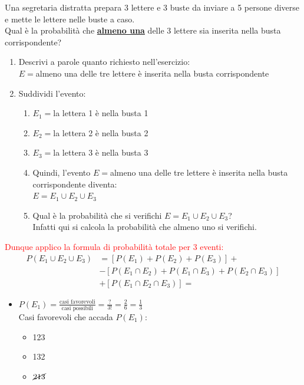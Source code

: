\documentclass{article}  %
\theoremstyle{definition}
\begin{document}
\begin{esercizio}[Esercizio]
	Una segretaria distratta prepara 3 lettere e 3 buste da inviare a 5 persone diverse e mette le lettere nelle buste a caso. \\
	Qual è la probabilità che \underline{\textbf{almeno una}} delle 3 lettere sia inserita nella busta corrispondente?
	\begin{enumerate}
		\item Descrivi a parole quanto richiesto nell'esercizio: \\
		      $E=$almeno una delle tre lettere è inserita nella busta corrispondente
		\item Suddividi l'evento:
		      \begin{enumerate}
			      \item $E_1=$la lettera 1 è nella busta 1
			      \item $E_2=$la lettera 2 è nella busta 2
			      \item $E_3=$la lettera 3 è nella busta 3
			      \item Quindi, l'evento $E=$almeno una delle tre lettere è inserita nella busta corrispondente diventa: \\ $E=E_1 \cup E_2 \cup E_3$
			      \item Qual è la probabilità che si verifichi $E=E_1 \cup E_2 \cup E_3$? \\ Infatti qui si calcola la probabilità che almeno uno si verifichi.
		      \end{enumerate}
	\end{enumerate}
	\textcolor{red}{Dunque applico la formula di probabilità totale per $3$ eventi:}
	\begin{align*}
		P(E_1 \cup E_2 \cup E_3)
		 & = [P(E_1)+P(E_2)+P(E_3)] +                          \\
		 & - [P(E_1 \cap E_2)+P(E_1 \cap E_3)+P(E_2 \cap E_3)] \\
		 & + [P(E_1 \cap E_2 \cap E_3)] =
	\end{align*}
	\begin{itemize}
		\item $P(E_1)=\frac{\text{casi favorevoli}}{\text{casi possibili}}=\frac{?}{3!}=\frac{2}{6}=\frac{1}{3}$ \\
		      Casi favorevoli che accada $P(E_1)$:
		      \begin{itemize}
			      \item 123
			      \item 132
			      \item $\cancel{213}$

\end{itemize}
\end{itemize}
\end{esercizio}
\end{document}
